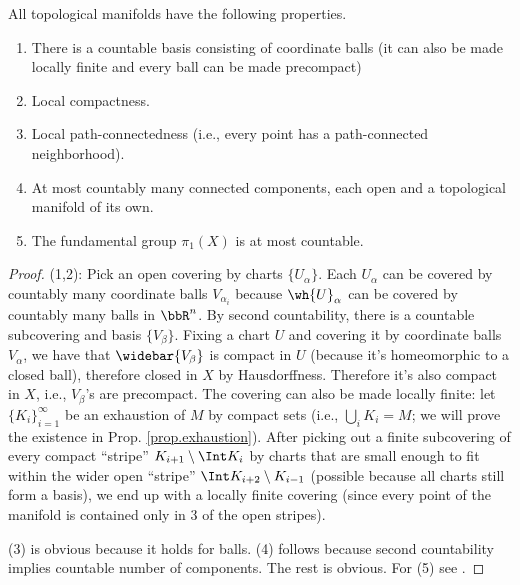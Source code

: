 \begin{thm} All topological manifolds have the following properties.
\begin{enumerate}[label=(\alph*)]
    \item There is a countable basis consisting of coordinate balls (it can also be made locally finite and every ball can be made precompact)
    \item Local compactness.
    \item Local path-connectedness (i.e., every point has a path-connected neighborhood).
    \item At most countably many connected components, each open and a topological manifold of its own.
    \item The fundamental group $\pi_1(X)$ is at most countable.
\end{enumerate}
\end{thm}
\begin{proof}
    (1,2): Pick an open covering by charts $\{U_\alpha\}$. Each $U_\alpha $ can be covered by countably many coordinate balls $V_{\alpha_i}$ because $\wh{U}_\alpha$ can be covered by countably many balls in $\bbR^n$. By second countability, there is a countable subcovering and basis $\{V_\beta\}$. Fixing a chart $U$ and covering it by coordinate balls $V_\alpha$, we have that $\widebar{V_\beta}$ is compact in $U$ (because it's homeomorphic to a closed ball), therefore closed in $X$ by Hausdorffness. Therefore it's also compact in $X$, i.e., $V_\beta$'s are precompact. The covering can also be made locally finite: let $\{K_i\}_{i=1}^\infty$ be an exhaustion of $M$ by compact sets (i.e., $\bigcup_i K_i=M$; we will prove the existence in Prop. \ref{prop.exhaustion}). After picking out a finite subcovering of every compact ``stripe'' $K_{i+1}\setminus \Int K_{i}$ by charts that are small enough to fit within the wider open ``stripe'' $\Int K_{i+2}\setminus K_{i-1}$ (possible because all charts still form a basis), we end up with a locally finite covering (since every point of the manifold is contained only in 3 of the open stripes).

    (3) is obvious because it holds for balls. (4) follows because second countability implies countable number of components. The rest is obvious. For (5) see \cite[Thm.~1.16]{Lee}.
\end{proof}

